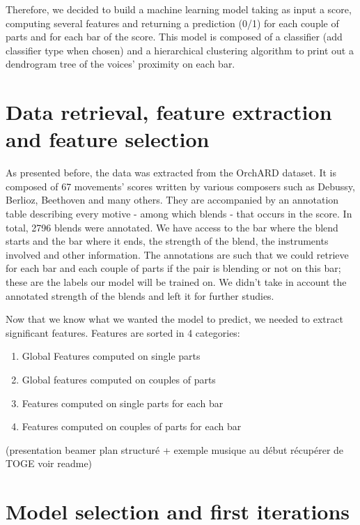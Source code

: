 \documentclass[11pt, a4paper]{article}
\begin{document}
Therefore, we decided to build a machine learning model taking as input a score, computing several features and returning a prediction (0/1) for each couple of parts and for each bar of the score.
This model is composed of a classifier (add classifier type when chosen) and a hierarchical clustering algorithm to print out a dendrogram tree of the voices' proximity on each bar.

\newpage

\tableofcontents

\newpage

\section{Data retrieval, feature extraction and feature selection}

As presented before, the data was extracted from the OrchARD dataset.
It is composed of 67 movements' scores written by various composers such as Debussy, Berlioz, Beethoven and many others.
They are accompanied by an annotation table describing every motive - among which blends - that occurs in the score. In total, 2796 blends were annotated.
We have access to the bar where the blend starts and the bar where it ends, the strength of the blend, the instruments involved and other information.
The annotations are such that we could retrieve for each bar and each couple of parts if the pair is blending or not on this bar; these are the labels our model will be trained on.
We didn't take in account the annotated strength of the blends and left it for further studies.

Now that we know what we wanted the model to predict, we needed to extract significant features.
Features are sorted in 4 categories:
\begin{enumerate}
    \item Global Features computed on single parts
    \item Global features computed on couples of parts
    \item Features computed on single parts for each bar
    \item Features computed on couples of parts for each bar
\end{enumerate}

(presentation beamer plan structuré + exemple musique au début récupérer de TOGE voir readme)

\section{Model selection and first iterations}
\end{document}
